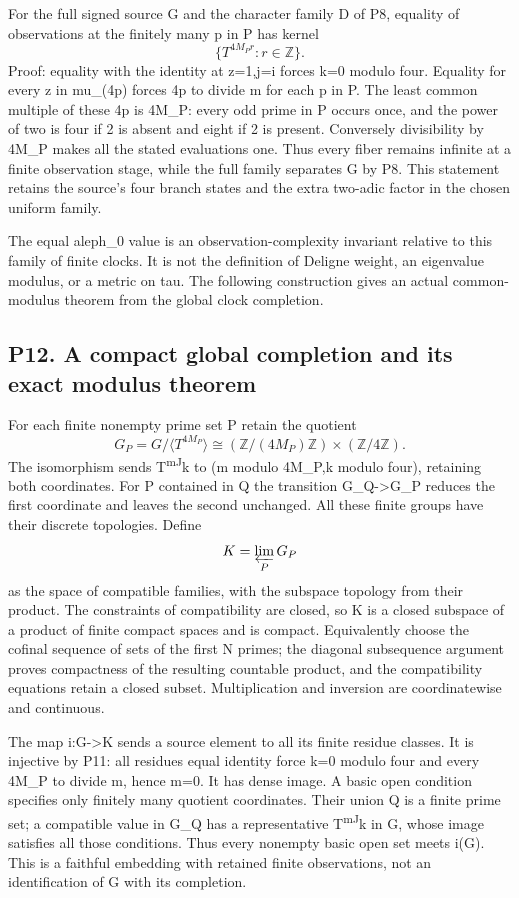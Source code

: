 \documentclass[
  11pt,
]{article}
\begin{document}
For the full signed source G and the character family D of P8, equality
of observations at the finitely many p in P has kernel \[
\{T^{4M_P r}:r\in\mathbb Z\}.
\] Proof: equality with the identity at z=1,j=i forces k=0 modulo four.
Equality for every z in mu\_(4p) forces 4p to divide m for each p in P.
The least common multiple of these 4p is 4M\_P: every odd prime in P
occurs once, and the power of two is four if 2 is absent and eight if 2
is present. Conversely divisibility by 4M\_P makes all the stated
evaluations one. Thus every fiber remains infinite at a finite
observation stage, while the full family separates G by P8. This
statement retains the source's four branch states and the extra two-adic
factor in the chosen uniform family.

The equal aleph\_0 value is an observation-complexity invariant relative
to this family of finite clocks. It is not the definition of Deligne
weight, an eigenvalue modulus, or a metric on tau. The following
construction gives an actual common-modulus theorem from the global
clock completion.

\subsection{P12. A compact global completion and its exact modulus
theorem}\label{p12.-a-compact-global-completion-and-its-exact-modulus-theorem}

For each finite nonempty prime set P retain the quotient \[
G_P=G/\langle T^{4M_P}\rangle
\cong (\mathbb Z/(4M_P)\mathbb Z)\times(\mathbb Z/4\mathbb Z).
\] The isomorphism sends T\textsuperscript{mJ}k to (m modulo 4M\_P,k
modulo four), retaining both coordinates. For P contained in Q the
transition G\_Q-\textgreater G\_P reduces the first coordinate and
leaves the second unchanged. All these finite groups have their discrete
topologies. Define \[
K=\varprojlim_P G_P
\] as the space of compatible families, with the subspace topology from
their product. The constraints of compatibility are closed, so K is a
closed subspace of a product of finite compact spaces and is compact.
Equivalently choose the cofinal sequence of sets of the first N primes;
the diagonal subsequence argument proves compactness of the resulting
countable product, and the compatibility equations retain a closed
subset. Multiplication and inversion are coordinatewise and continuous.

The map i:G-\textgreater K sends a source element to all its finite
residue classes. It is injective by P11: all residues equal identity
force k=0 modulo four and every 4M\_P to divide m, hence m=0. It has
dense image. A basic open condition specifies only finitely many
quotient coordinates. Their union Q is a finite prime set; a compatible
value in G\_Q has a representative T\textsuperscript{mJ}k in G, whose
image satisfies all those conditions. Thus every nonempty basic open set
meets i(G). This is a faithful embedding with retained finite
observations, not an identification of G with its completion.
\end{document}

